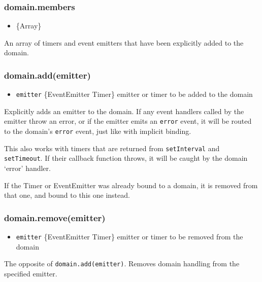 \subsubsection{domain.members}\label{domain.members}

\begin{itemize}
\itemsep1pt\parskip0pt
\item
  \{Array\}
\end{itemize}

An array of timers and event emitters that have been explicitly added to
the domain.

\subsubsection{domain.add(emitter)}\label{domain.addemitter}

\begin{itemize}
\itemsep1pt\parskip0pt
\item
  \texttt{emitter} \{EventEmitter \textbar{} Timer\} emitter or timer to
  be added to the domain
\end{itemize}

Explicitly adds an emitter to the domain. If any event handlers called
by the emitter throw an error, or if the emitter emits an \texttt{error}
event, it will be routed to the domain's \texttt{error} event, just like
with implicit binding.

This also works with timers that are returned from \texttt{setInterval}
and \texttt{setTimeout}. If their callback function throws, it will be
caught by the domain `error' handler.

If the Timer or EventEmitter was already bound to a domain, it is
removed from that one, and bound to this one instead.

\subsubsection{domain.remove(emitter)}\label{domain.removeemitter}

\begin{itemize}
\itemsep1pt\parskip0pt
\item
  \texttt{emitter} \{EventEmitter \textbar{} Timer\} emitter or timer to
  be removed from the domain
\end{itemize}

The opposite of \texttt{domain.add(emitter)}. Removes domain handling
from the specified emitter.

